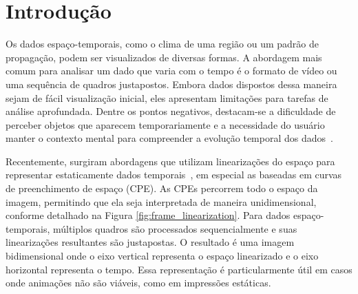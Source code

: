 \documentclass[12pt]{article}
\begin{document}
\section{Introdução}

Os dados espaço-temporais, como o clima de uma região ou um padrão de propagação, podem ser visualizados
de diversas formas. A abordagem mais comum para analisar um dado que varia com o tempo é o formato de
vídeo ou uma sequência de quadros justapostos. Embora dados dispostos dessa maneira sejam de fácil
visualização inicial, eles apresentam limitações para tarefas de análise aprofundada.
Dentre os pontos negativos, destacam-se a dificuldade de perceber objetos que aparecem temporariamente
e a necessidade do usuário manter o contexto mental para compreender a evolução temporal dos dados~\cite{PenaAraya:20}.


Recentemente, surgiram abordagens que utilizam linearizações do espaço para representar estaticamente dados
temporais~\cite{franke:21, KoeppWeinkauf2022_TMTM}, em especial as baseadas em curvas de preenchimento de espaço (CPE).
As CPEs percorrem todo o espaço da imagem, permitindo que ela seja interpretada de maneira unidimensional, conforme
detalhado na Figura \ref{fig:frame_linearization}. Para dados espaço-temporais, múltiplos quadros são processados
sequencialmente e suas linearizações resultantes são justapostas. O resultado é uma imagem bidimensional onde o eixo
vertical representa o espaço linearizado e o eixo horizontal representa o tempo. Essa representação é particularmente
útil em casos onde animações não são viáveis, como em impressões estáticas.
\end{document}
